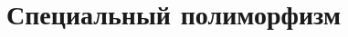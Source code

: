 \documentclass[12pt]{article}
\begin{document}




    \section{Специальный полиморфизм} \label{sec:ad-hoc}





    \cite{hudak2007history}

    \cite{wadler1989make}





















\end{document}
